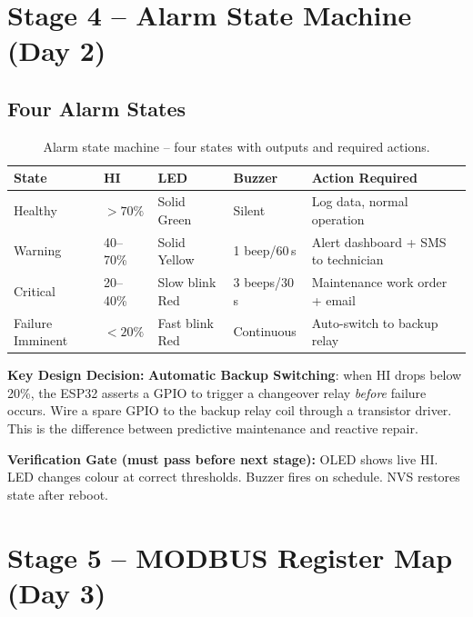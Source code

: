 \documentclass[12pt,a4paper]{article}
\newenvironment{fixbox}{%
  \begin{mdframed}[backgroundcolor=fixbg,linecolor=fixln,linewidth=2pt,
    innerleftmargin=9pt,innerrightmargin=9pt,innertopmargin=6pt,innerbottommargin=6pt]
  \textbf{\color{fixln}Key Design Decision: }}{\end{mdframed}}
\newenvironment{checkgate}{%
  \begin{mdframed}[backgroundcolor=yellow!10,linecolor=orange!70,linewidth=1.5pt,
    innerleftmargin=9pt,innerrightmargin=9pt,innertopmargin=5pt,innerbottommargin=5pt]
  \textbf{\color{orange!70!black}Verification Gate (must pass before next stage): }}{\end{mdframed}}
\begin{document}
\section{Stage 4 -- Alarm State Machine (Day 2)}

\subsection{Four Alarm States}

\begin{table}[H]
\centering
\renewcommand{\arraystretch}{1.4}
\begin{tabularx}{\textwidth}{llllX}
\toprule
\textbf{State} & \textbf{HI} & \textbf{LED} & \textbf{Buzzer} & \textbf{Action Required} \\
\midrule
Healthy          & $>70\%$   & Solid Green    & Silent        & Log data, normal operation \\
Warning          & 40--70\%  & Solid Yellow   & 1 beep/60\,s  & Alert dashboard + SMS to technician \\
Critical         & 20--40\%  & Slow blink Red & 3 beeps/30\,s & Maintenance work order + email \\
Failure Imminent & $<20\%$   & Fast blink Red & Continuous    & Auto-switch to backup relay \\
\bottomrule
\end{tabularx}
\caption{Alarm state machine -- four states with outputs and required actions.}
\end{table}

\begin{fixbox}
\textbf{Automatic Backup Switching}: when HI drops below 20\%, the ESP32 asserts a GPIO to trigger a
changeover relay \textit{before} failure occurs. Wire a spare GPIO to the backup relay coil through a transistor
driver. This is the difference between predictive maintenance and reactive repair.
\end{fixbox}

\begin{checkgate}
OLED shows live HI. LED changes colour at correct thresholds. Buzzer fires on schedule. NVS restores state
after reboot.
\end{checkgate}

\section{Stage 5 -- MODBUS Register Map (Day 3)}
\end{document}
